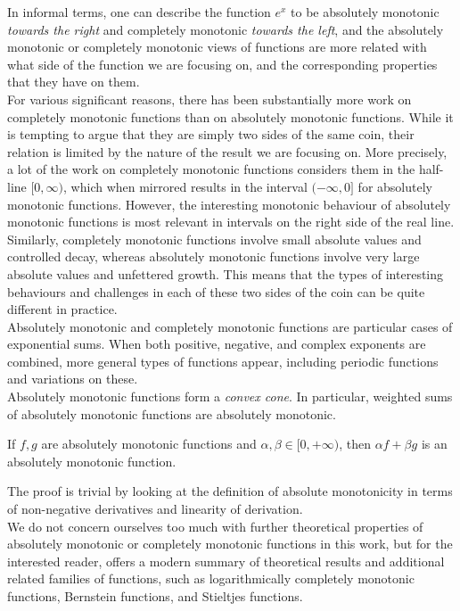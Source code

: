 \documentclass[12pt,a4paper]{article}
\begin{document}
In informal terms, one can describe the function $e^x$ to be absolutely monotonic {\emph{towards the right}} and completely monotonic {\emph{towards the left}}, and the absolutely monotonic or completely monotonic views of functions are more related with what side of the function we are focusing on, and the corresponding properties that they have on them.\\

For various significant reasons, there has been substantially more work on completely monotonic functions than on absolutely monotonic functions. While it is tempting to argue that they are simply two sides of the same coin, their relation is limited by the nature of the result we are focusing on. More precisely, a lot of the work on completely monotonic functions considers them in the half-line $[0,\infty)$, which when mirrored results in the interval $(-\infty,0]$ for absolutely monotonic functions. However, the interesting monotonic behaviour of absolutely monotonic functions is most relevant in intervals on the right side of the real line. Similarly, completely monotonic functions involve small absolute values and controlled decay, whereas absolutely monotonic functions involve very large absolute values and unfettered growth. This means that the types of interesting behaviours and challenges in each of these two sides of the coin can be quite different in practice.\\

Absolutely monotonic and completely monotonic functions are particular cases of exponential sums. When both positive, negative, and complex exponents are combined, more general types of functions appear, including periodic functions and variations on these.\\

Absolutely monotonic functions form a {\emph{convex cone}}. In particular, weighted sums of absolutely monotonic functions are absolutely monotonic.

\begin{lemma}
If $f, g$ are absolutely monotonic functions and $\alpha, \beta \in [0,+\infty)$, then $\alpha f + \beta g$ is an absolutely monotonic function.
\end{lemma}

The proof is trivial by looking at the definition of absolute monotonicity in terms of non-negative derivatives and linearity of derivation.\\

We do not concern ourselves too much with further theoretical properties of absolutely monotonic or completely monotonic functions in this work, but for the interested reader, \cite{2014_koumandos_completely_monotonic} offers a modern summary of theoretical results and additional related families of functions, such as logarithmically completely monotonic functions, Bernstein functions, and Stieltjes functions.\\
\end{document}
